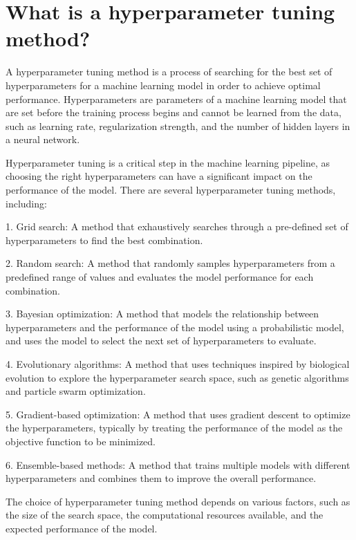 \section{What is a hyperparameter tuning method?}
A hyperparameter tuning method is a process of searching for the best set of hyperparameters for a machine learning model in order to achieve optimal performance. Hyperparameters are parameters of a machine learning model that are set before the training process begins and cannot be learned from the data, such as learning rate, regularization strength, and the number of hidden layers in a neural network.

Hyperparameter tuning is a critical step in the machine learning pipeline, as choosing the right hyperparameters can have a significant impact on the performance of the model. There are several hyperparameter tuning methods, including:

1. Grid search: A method that exhaustively searches through a pre-defined set of hyperparameters to find the best combination.

2. Random search: A method that randomly samples hyperparameters from a predefined range of values and evaluates the model performance for each combination.

3. Bayesian optimization: A method that models the relationship between hyperparameters and the performance of the model using a probabilistic model, and uses the model to select the next set of hyperparameters to evaluate.

4. Evolutionary algorithms: A method that uses techniques inspired by biological evolution to explore the hyperparameter search space, such as genetic algorithms and particle swarm optimization.

5. Gradient-based optimization: A method that uses gradient descent to optimize the hyperparameters, typically by treating the performance of the model as the objective function to be minimized.

6. Ensemble-based methods: A method that trains multiple models with different hyperparameters and combines them to improve the overall performance.

The choice of hyperparameter tuning method depends on various factors, such as the size of the search space, the computational resources available, and the expected performance of the model.


